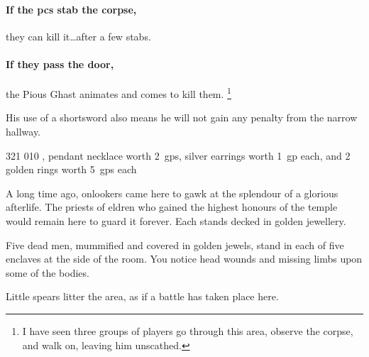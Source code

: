 \begin{multicols}{2}
\paragraph{If the \glspl{pc} stab the corpse,}
they can kill it\ldots after a few stabs.

\paragraph{If they pass the door,}
the Pious Ghast animates and comes to kill them.%
\footnote{I have seen three groups of players go through this area, observe the corpse, and walk on, leaving him unscathed.}

His use of a shortsword also means he will not gain any penalty from the narrow hallway.

%
  {{3}{2}{1}}%
  {{0}{1}{0}}%
  {%
    \shortsword
    \completeplate
  }%
  {\stunningstrike, \adrenalinesurge}%
  {pendant necklace worth 2~\glspl{gp}, silver earrings worth 1~\gls{gp} each, and 2 golden rings worth 5~\glspl{gp} each}%
  {\undead}%


A long time ago, onlookers came here to gawk at the splendour of a glorious afterlife.
The priests of \gls{eldren} who gained the highest honours of the temple would remain here to guard it forever.
Each stands decked in golden jewellery.

\begin{boxtext}

  Five dead men, mummified and covered in golden jewels, stand in each of five enclaves at the side of the room.
  You notice head wounds and missing limbs upon some of the bodies.

  Little spears litter the area, as if a battle has taken place here.

\end{boxtext}





\end{multicols}
